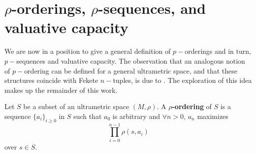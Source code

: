 


\section{$\rho$-orderings, $\rho$-sequences, and valuative capacity}

We are now in a position to give a general definition of $p-$orderings and in turn, $p-$sequences and valuative capacity. The observation that an analogous notion of $p-$ordering can be defined for a general ultrametric space, and that these structures coincide with Fekete $n-$tuples, is due to \cite{kj}. The exploration of this idea makes up the remainder of this work. \\ 

\begin{definition}
	\cite{kj} Let $S$ be a subset of an ultrametric space $(M,\rho)$. A \textbf{$\rho$-ordering} of $S$ is a sequence $\{a_i\}_{i \geq 0}$ in $S$ such that $a_0$ is arbitrary and $\forall n > 0$, $a_n$ maximizes \[\prod_{i=0}^{n-1} \rho(s,a_i)\] over $s \in S$. 
\end{definition}

